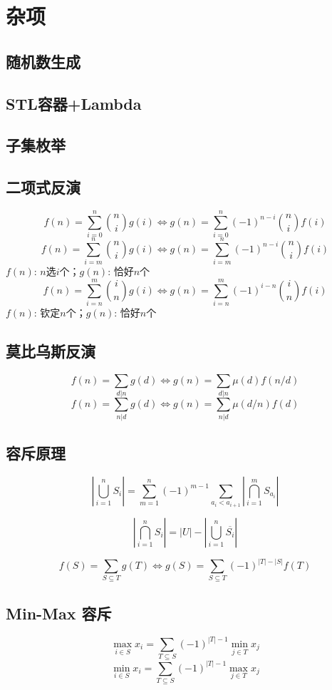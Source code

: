 \section{杂项}

\subsection{随机数生成}


\subsection{STL容器+Lambda}


\subsection{子集枚举}


\subsection{二项式反演}
$$ f(n)=\sum\limits_{i=0}^n\binom{n}{i}g(i) \Longleftrightarrow  g(n)=\sum\limits_{i=0}^n(-1)^{n-i}\binom{n}{i}f(i)$$
$$ f(n)=\sum\limits_{i=m}^n\binom{n}{i}g(i) \Longleftrightarrow  g(n)=\sum\limits_{i=m}^n(-1)^{n-i}\binom{n}{i}f(i)$$
$f(n)$: $n$选$i$个；$g(n)$: 恰好$n$个
$$f(n)=\sum\limits_{i=n}^m\binom{i}{n}g(i)\Longleftrightarrow g(n)=\sum\limits_{i=n}^m(-1)^{i-n}\binom{i}{n}f(i)$$
$f(n)$: 钦定$n$个；$g(n)$: 恰好$n$个

\subsection{莫比乌斯反演}

$$ f(n)=\sum\limits_{d|n} g(d)\Longleftrightarrow g(n)=\sum\limits_{d|n}\mu(d)f(n/d)$$
$$ f(n)=\sum\limits_{n|d} g(d)\Longleftrightarrow g(n)=\sum\limits_{n|d}\mu(d/n)f(d)$$

\subsection{容斥原理}

$$\left| \bigcup\limits_{i=1}^n S_i \right| = \sum\limits_{m=1}^n(-1)^{m-1}\sum\limits_{a_i<a_{i+1}}\left|\bigcap\limits_{i=1}^m S_{a_i}\right| $$

$$\left| \bigcap\limits_{i=1}^n S_i \right| = |U|-\left| \bigcup\limits_{i=1}^n \overline{S_i} \right|$$

$$f(S)=\sum\limits_{S\subseteq T}g(T)\Longleftrightarrow g(S)=\sum\limits_{S\subseteq T}(-1)^{|T|-|S|}f(T)$$

\subsection{Min-Max 容斥}

$$\max\limits_{i\in S}x_i = \sum_{T\subseteq S}(-1)^{|T|-1}\min\limits_{j\in T}x_j$$
$$\min\limits_{i\in S}x_i = \sum_{T\subseteq S}(-1)^{|T|-1}\max\limits_{j\in T}x_j$$